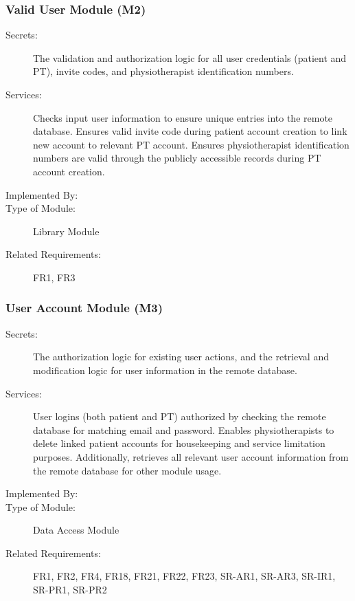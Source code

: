 \documentclass[12pt, titlepage]{article}
\begin{document}
\subsubsection{Valid User Module (M2)}
\begin{description}
    \item[Secrets:] The validation and authorization logic for all user credentials (patient and PT), invite codes, and physiotherapist identification numbers.
    \item[Services:] Checks input user information to ensure unique entries into the remote database. Ensures valid invite code during patient account creation to link new account to relevant PT account. Ensures physiotherapist identification numbers are valid through the publicly accessible records during PT account creation.
    \item[Implemented By:] \progname{}
    \item[Type of Module:] Library Module
    \item[Related Requirements:] FR1, FR3
\end{description}

\subsubsection{User Account Module (M3)}
\begin{description}
    \item[Secrets:] The authorization logic for existing user actions, and the retrieval and modification logic for user information in the remote database.
    \item[Services:] User logins (both patient and PT) authorized by checking the remote database for matching email and password. Enables physiotherapists to delete linked patient accounts for housekeeping and service limitation purposes. Additionally, retrieves all relevant user account information from the remote database for other module usage.
    \item[Implemented By:] \progname{}
    \item[Type of Module:] Data Access Module
    \item[Related Requirements:] FR1, FR2, FR4, FR18, FR21, FR22, FR23, SR-AR1, SR-AR3, SR-IR1, SR-PR1, SR-PR2
\end{description}
\end{document}
